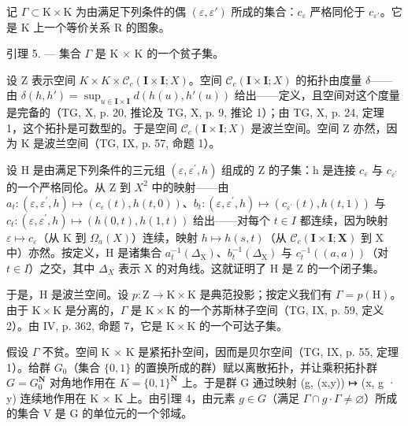 记 \(\Gamma \subset \mathrm{K} \times \mathrm{K}\) 为由满足下列条件的偶 \((\varepsilon, \varepsilon')\) 所成的集合：\(c_{\varepsilon}\) 严格同伦于 \(c_{\varepsilon'}\)。它是 K 上一个等价关系 R 的图象。

引理 5. --- 集合 \(\Gamma\) 是 K × K 的一个贫子集。

设 Z 表示空间 \(K \times K \times \mathcal{C}_{c}(\mathbf{I} \times \mathbf{I}; X)\)。空间 \(\mathcal{C}_{c}(\mathbf{I} \times \mathbf{I}; X)\) 的拓扑由度量 \(\delta\)——由 \(\delta(h, h') = \sup_{u \in \mathbf{I} \times \mathbf{I}} d(h(u), h'(u))\) 给出——定义，且空间对这个度量是完备的（TG, X, p. 20, 推论及 TG, X, p. 9, 推论 1）；由 TG, X, p. 24, 定理 1，这个拓扑是可数型的。于是空间 \(\mathcal{C}_{c}(\mathbf{I} \times \mathbf{I}; X)\) 是波兰空间。空间 Z 亦然，因为 K 是波兰空间（TG, IX, p. 57, 命题 1）。

设 H 是由满足下列条件的三元组 \((\varepsilon,\varepsilon^{\prime},h)\) 组成的 Z 的子集：h 是连接 \(c_{\varepsilon}\) 与 \(c_{\varepsilon^{\prime}}\) 的一个严格同伦。从 Z 到 \(X^{2}\) 中的映射——由 \(a_{t}\colon(\varepsilon,\varepsilon^{\prime},h)\mapsto(c_{\varepsilon}(t),h(t,0))\)、\(b_{t}\colon(\varepsilon,\varepsilon^{\prime},h)\mapsto(c_{\varepsilon^{\prime}}(t),h(t,1))\) 与 \(c_{t}\colon(\varepsilon,\varepsilon^{\prime},h)\mapsto(h(0,t),h(1,t))\) 给出——对每个 \(t\in I\) 都连续，因为映射 \(\varepsilon\mapsto c_{\varepsilon}\)（从 K 到 \(\Omega_{a}(X)\)）连续，映射 \(h\mapsto h(s,t)\)（从 \(\mathcal{C}_{c}(\mathbf{I}\times\mathbf{I};\mathbf{X})\) 到 X 中）亦然。按定义，H 是诸集合 \(a_{t}^{-1}(\Delta_{\mathrm{X}})\)、\(b_{t}^{-1}(\Delta_{\mathrm{X}})\) 与 \(c_{t}^{-1}((a,a))\)（对 \(t\in I\)）之交，其中 \(\Delta_{X}\) 表示 X 的对角线。这就证明了 H 是 Z 的一个闭子集。

于是，H 是波兰空间。设 \(p \colon \mathrm{Z} \to \mathrm{K} \times \mathrm{K}\) 是典范投影；按定义我们有 \(\Gamma = p(\mathrm{H})\)。由于 \(\mathrm{K} \times \mathrm{K}\) 是分离的，\(\Gamma\) 是 \(\mathrm{K} \times \mathrm{K}\) 的一个苏斯林子空间（TG, IX, p. 59, 定义 2）。由 IV, p. 362, 命题 7，它是 \(\mathrm{K} \times \mathrm{K}\) 的一个可达子集。

假设 \(\Gamma\) 不贫。空间 K × K 是紧拓扑空间，因而是贝尔空间（TG, IX, p. 55, 定理 1）。给群 \(G_{0}\)（集合 \(\{0,1\}\) 的置换所成的群）赋以离散拓扑，并让乘积拓扑群 \(G = G_{0}^{\mathbf{N}}\) 对角地作用在 \(K = \{0,1\}^{\mathbf{N}}\) 上。于是群 G 通过映射 (g, (x,y)) ↦ (x, g · y) 连续地作用在 K × K 上。由引理 4，由元素 \(g \in G\)（满足 \(\Gamma \cap g \cdot \Gamma \neq \varnothing\)）所成的集合 V 是 G 的单位元的一个邻域。

